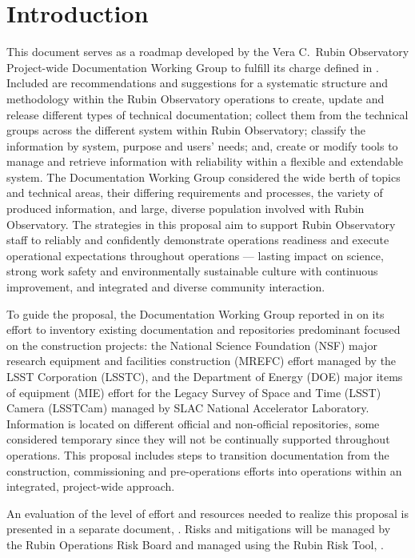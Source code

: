 \section{Introduction}

This document serves as a roadmap developed by the Vera C.\ Rubin Observatory Project-wide Documentation Working Group to fulfill its charge defined in .
Included are recommendations and suggestions for a systematic structure and methodology within the Rubin Observatory operations to create, update and release different types of technical documentation; collect them from the technical groups across the different system within Rubin Observatory; classify the information by system, purpose and users' needs; and, create or modify tools to manage and retrieve information with reliability within a flexible and extendable system.
The Documentation Working Group considered the wide berth of topics and technical areas, their differing requirements and processes, the variety of produced information, and large, diverse population involved with Rubin Observatory.
The strategies in this proposal aim to support Rubin Observatory staff to reliably and confidently demonstrate operations readiness  and execute operational expectations throughout operations --- lasting impact on science, strong work safety and environmentally sustainable culture with continuous improvement, and integrated and diverse community interaction.

To guide the proposal, the Documentation Working Group reported in  on its effort to inventory existing documentation and repositories predominant focused on the construction projects: the National Science Foundation (NSF) major research equipment and facilities construction (MREFC) effort managed by the LSST Corporation (LSSTC), and the Department of Energy (DOE) major items of equipment (MIE) effort for the Legacy Survey of Space and Time (LSST) Camera (LSSTCam) managed by SLAC National Accelerator Laboratory.
Information is located on different official and non-official repositories, some considered temporary since they will not be continually supported throughout operations.
This proposal includes steps to transition documentation from the construction, commissioning and pre-operations efforts into operations within an integrated, project-wide approach.

An evaluation of the level of effort and resources needed to realize this proposal is presented in a separate document, . 
Risks and mitigations will be managed by the Rubin Operations Risk Board and managed using the Rubin Risk Tool, .

